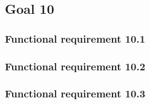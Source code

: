 \subsection{Goal 10}

\setcounter{secnumdepth}{3}
\subsubsection{Functional requirement 10.1}

\subsubsection{Functional requirement 10.2}

\subsubsection{Functional requirement 10.3}

